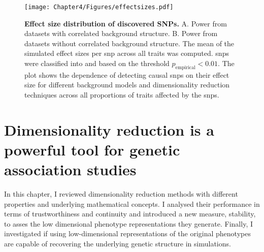 %
\begin{figure}[hbtp]
	\centering
	\texttt{[image: Chapter4/Figures/effectsizes.pdf]}
	\caption[\textbf{Effect size distribution of discovered SNPs.}]{\textbf{Effect size distribution of discovered SNPs. } A. Power from datasets with correlated background structure. B. Power from datasets without correlated background structure. The mean of the simulated effect sizes per \gls{snp} across all traits was computed. \glspl{snp} were classified into  and  based on the threshold \(p_\text{empirical} < 0.01\). The plot shows the dependence of detecting causal \glspl{snp} on their effect size for different background models and dimensionality reduction techniques across all proportions of traits affected by the \glspl{snp}.} 
	 	\label{fig:effectsizes-dimRed}
\end{figure}
%
\section{Dimensionality reduction is a powerful tool for genetic association studies}
In this chapter, I reviewed dimensionality reduction methods with different properties and underlying mathematical concepts. I analysed their performance in terms of trustworthiness and continuity and introduced a new measure, stability, to asses the low dimensional phenotype representations they generate. Finally, I investigated if using low-dimensional representations of the original phenotypes are capable of recovering the underlying genetic structure in simulations.

